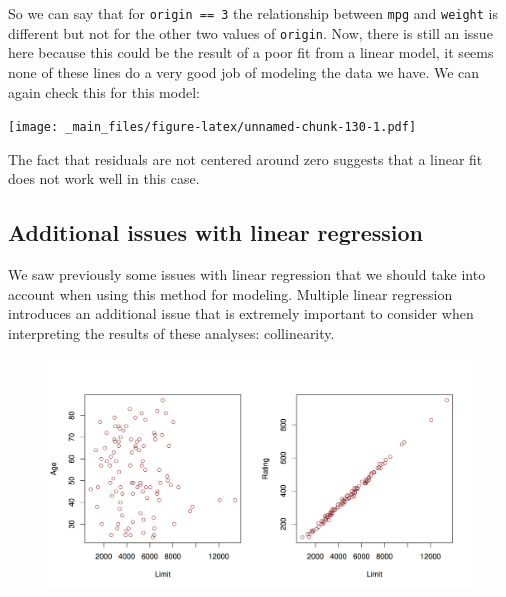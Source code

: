 \documentclass[]{article}
\newenvironment{Shaded}{\begin{snugshade}}{\end{snugshade}}
\newcommand{\KeywordTok}[1]{\textcolor[rgb]{0.13,0.29,0.53}{\textbf{{#1}}}}
\newcommand{\DataTypeTok}[1]{\textcolor[rgb]{0.13,0.29,0.53}{{#1}}}
\newcommand{\StringTok}[1]{\textcolor[rgb]{0.31,0.60,0.02}{{#1}}}
\newcommand{\NormalTok}[1]{{#1}}
\theoremstyle{definition}
\theoremstyle{definition}
\theoremstyle{remark}
\begin{document}
So we can say that for \texttt{origin\ ==\ 3} the relationship between
\texttt{mpg} and \texttt{weight} is different but not for the other two
values of \texttt{origin}. Now, there is still an issue here because
this could be the result of a poor fit from a linear model, it seems
none of these lines do a very good job of modeling the data we have. We
can again check this for this model:

\begin{Shaded}
\end{Shaded}

\texttt{[image: \_main\_files/figure-latex/unnamed-chunk-130-1.pdf]}

The fact that residuals are not centered around zero suggests that a
linear fit does not work well in this case.

\subsection{Additional issues with linear
regression}\label{additional-issues-with-linear-regression}

We saw previously some issues with linear regression that we should take
into account when using this method for modeling. Multiple linear
regression introduces an additional issue that is extremely important to
consider when interpreting the results of these analyses: collinearity.

\begin{figure}[htbp]
\centering
\includegraphics{img/collinearity.png}
\caption{}
\end{figure}
\end{document}
